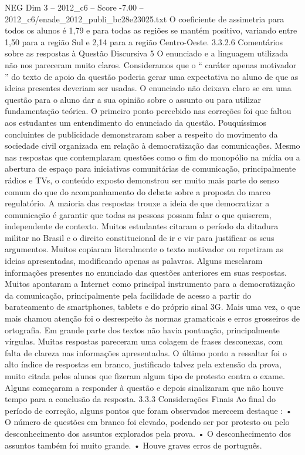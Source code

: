 \begin{textsample}{NEG Dim 3 – 2012\_c6 – Score -7.00 – 2012\_c6/enade\_2012\_publi\_bc28e23025.txt}
O coeficiente de assimetria para todos os alunos é 1,79 e para todas as regiões se mantém positivo, variando entre 1,50 para a região Sul e 2,14 para a região Centro-Oeste. 3.3.2.6 Comentários sobre as respostas à Questão Discursiva 5 O enunciado e a linguagem utilizada não nos pareceram muito claros.
Consideramos que o “ caráter apenas motivador ” do texto de apoio da questão poderia gerar uma expectativa no aluno de que as ideias presentes deveriam ser usadas.
O enunciado não deixava claro se era uma questão para o aluno dar a sua opinião sobre o assunto ou para utilizar fundamentação teórica.
O primeiro ponto percebido nas correções foi que faltou aos estudantes um entendimento do enunciado da questão.
Pouquíssimos concluintes de publicidade demonstraram saber a respeito do movimento da sociedade civil organizada em relação à democratização das comunicações.
Mesmo nas respostas que contemplaram questões como o fim do monopólio na mídia ou a abertura de espaço para iniciativas comunitárias de comunicação, principalmente rádios e TVs, o conteúdo exposto demonstrou ser muito mais parte do senso comum do que do acompanhamento do debate sobre a proposta do marco regulatório.
A maioria das respostas trouxe a ideia de que democratizar a comunicação é garantir que todas as pessoas possam falar o que quiserem, independente de contexto.
Muitos estudantes citaram o período da ditadura militar no Brasil e o direito constitucional de ir e vir para justificar os seus argumentos.
Muitos copiaram literalmente o texto motivador ou repetiram as ideias apresentadas, modificando apenas as palavras.
Alguns mesclaram informações presentes no enunciado das questões anteriores em suas respostas.
Muitos apontaram a Internet como principal instrumento para a democratização da comunicação, principalmente pela facilidade de acesso a partir do barateamento de smartphones, tablets e do próprio sinal 3G.
Mais uma vez, o que mais chamou atenção foi o desrespeito às normas gramaticais e erros grosseiros de ortografia.
Em grande parte dos textos não havia pontuação, principalmente vírgulas.
Muitas respostas pareceram uma colagem de frases desconexas, com falta de clareza nas informações apresentadas.
O último ponto a ressaltar foi o alto índice de respostas em branco, justificado talvez pela extensão da prova, muito citada pelos alunos que fizeram algum tipo de protesto contra o exame.
Alguns começaram a responder à questão e depois sinalizaram que não houve tempo para a conclusão da resposta. 3.3.3 Considerações Finais Ao final do período de correção, alguns pontos que foram observados merecem destaque : • O número de questões em branco foi elevado, podendo ser por protesto ou pelo desconhecimento dos assuntos explorados pela prova. • O desconhecimento dos assuntos também foi muito grande. • Houve graves erros de português.

\end{textsample}
